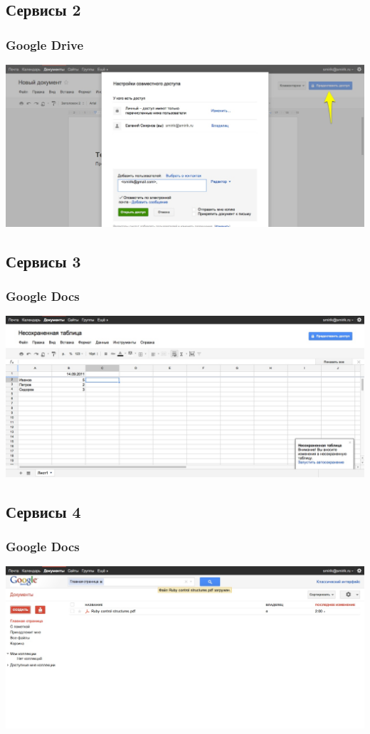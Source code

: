 \documentclass[compress,red]{beamer}
\begin{document}
\subsection{Сервисы 2}
\begin{frame}
  \frametitle{Google Drive}
	\centerline{\includegraphics[width=1.0\textwidth]{images/gdocs3.jpg}}
\end{frame}

\subsection{Сервисы 3}
\begin{frame}
  \frametitle{Google Docs}
	\centerline{\includegraphics[width=1.0\textwidth]{images/gdocs4.jpg}}
\end{frame}

\subsection{Сервисы 4}
\begin{frame}
  \frametitle{Google Docs}
	\centerline{\includegraphics[width=1.0\textwidth]{images/gdocs1.jpg}}
\end{frame}
\end{document}
